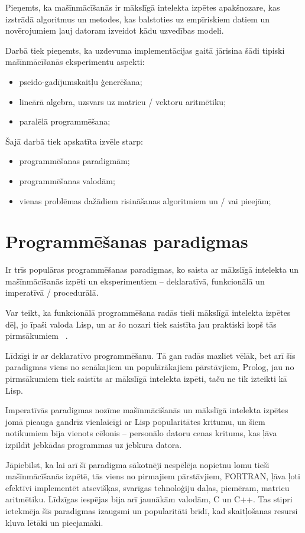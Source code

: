 \documentclass{ludis}
\begin{document}
Pieņemts, ka mašīnmācīšanās ir mākslīgā intelekta izpētes apakšnozare, kas izstrādā algoritmus un metodes, kas balstoties uz empīriskiem datiem un novērojumiem ļauj datoram izveidot kādu uzvedības modeli.

Darbā tiek pieņemts, ka uzdevuma implementācijas gaitā jārisina šādi tipiski mašīnmācīšanās eksperimentu aspekti:
\begin{itemize}
\item pseido-gadījumskaitļu ģenerēšana;
\item lineārā algebra, uzsvars uz matricu / vektoru aritmētiku;
\item paralēlā programmēšana;
\end{itemize}

Šajā darbā tiek apskatīta izvēle starp:
\begin{itemize}
\item programmēšanas paradigmām;
\item programmēšanas valodām;
\item vienas problēmas dažādiem risināšanas algoritmiem un / vai pieejām;
\end{itemize}

\section{Programmēšanas paradigmas} \label{sec:paradigms}
Ir trīs populāras programmēšanas paradigmas, ko saista ar mākslīgā intelekta un mašīnmācīšanās izpēti un eksperimentiem -- deklaratīvā, funkcionālā un imperatīvā / procedurālā. 

Var teikt, ka funkcionālā programmēšana radās tieši mākslīgā intelekta izpētes dēļ, jo īpaši valoda Lisp, un ar šo nozari tiek saistīta jau praktiski kopš tās pirmsākumiem ~\cite{hist_lisp}. 

Līdzīgi ir ar deklaratīvo programmēšanu. Tā gan radās mazliet vēlāk, bet arī šīs paradigmas viens no senākajiem un populārākajiem pārstāvjiem, Prolog, jau no pirmsākumiem tiek saistīts ar mākslīgā intelekta izpēti, taču ne tik izteikti kā Lisp.

Imperatīvās paradigmas nozīme mašīnmācīšanās un mākslīgā intelekta izpētes jomā pieauga gandrīz vienlaicīgi ar Lisp popularitātes kritumu, un šiem notikumiem bija vienots cēlonis -- personālo datoru cenas kritums, kas ļāva izpildīt jebkādas programmas uz jebkura datora. 

Jāpiebilst, ka lai arī šī paradigma sākotnēji nespēlēja nopietnu lomu tieši mašīnmācīšanās izpētē, tās viens no pirmajiem pārstāvjiem, FORTRAN, ļāva ļoti efektīvi implementēt atsevišķas, svarīgas tehnoloģiju daļas, piemēram, matricu aritmētiku. Līdzīgas iespējas bija arī jaunākām valodām, C un C++. Tas stipri ietekmēja šīs paradigmas izaugsmi un popularitāti brīdī, kad skaitļošanas resursi kļuva lētāki un pieejamāki.
\end{document}
